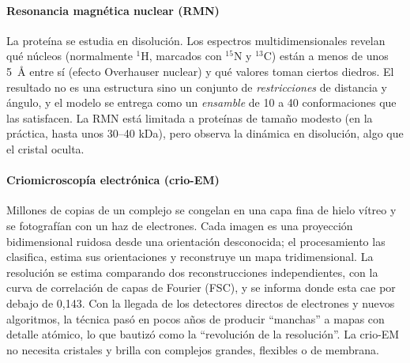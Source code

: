 \paragraph{Resonancia magnética nuclear (RMN)} La proteína se estudia en disolución. Los espectros multidimensionales revelan qué núcleos (normalmente $^1$H, marcados con $^{15}$N y $^{13}$C) están a menos de unos \SI{5}{\angstrom} entre sí (efecto Overhauser nuclear) y qué valores toman ciertos diedros. El resultado no es una estructura sino un conjunto de \emph{restricciones} de distancia y ángulo, y el modelo se entrega como un \emph{ensamble} de 10 a 40 conformaciones que las satisfacen. La RMN está limitada a proteínas de tamaño modesto (en la práctica, hasta unos 30--40 kDa), pero observa la dinámica en disolución, algo que el cristal oculta.

\paragraph{Criomicroscopía electrónica (crio-EM)} Millones de copias de un complejo se congelan en una capa fina de hielo vítreo y se fotografían con un haz de electrones. Cada imagen es una proyección bidimensional ruidosa desde una orientación desconocida; el procesamiento las clasifica, estima sus orientaciones y reconstruye un mapa tridimensional. La resolución se estima comparando dos reconstrucciones independientes, con la curva de correlación de capas de Fourier (FSC), y se informa donde esta cae por debajo de 0,143. Con la llegada de los detectores directos de electrones y nuevos algoritmos, la técnica pasó en pocos años de producir ``manchas'' a mapas con detalle atómico, lo que \textcite{c15-kuhlbrandt2014} bautizó como la ``revolución de la resolución''. La crio-EM no necesita cristales y brilla con complejos grandes, flexibles o de membrana.

